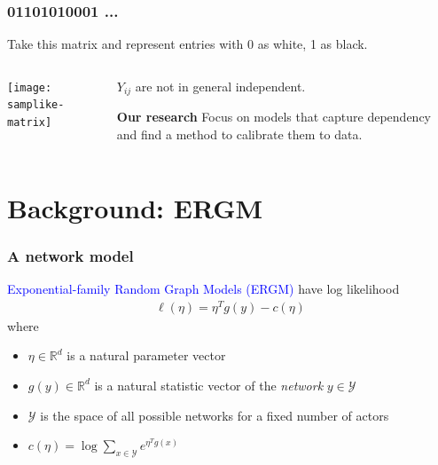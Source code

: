 \documentclass[ 10pt]{beamer}
\def\RR{{\mathbb R}}
\def\YY{{\mathcal Y}}
\newcommand{\fatdot}{\,\cdot\,}
\newcommand{\inner}[1]{\langle #1 \rangle}
\begin{document}
{
\frametitle{01101010001 ...}
Take this matrix and represent entries with 0 as white, 1 as black.
\begin{columns}[T]
\begin{column}[T]{0.4\textwidth}
\texttt{[image: samplike-matrix]}
\end{column}
\pause
\begin{column}[T]{0.6\textwidth}
\vspace{5mm}

$Y_{ij}$ are \alert{not} in general independent.
\vspace{2mm}

\begin{block}{\textbf{Our research}}
Focus on models that capture dependency and find a method to calibrate them to data.
\end{block}

\end{column}
\end{columns}





}
\section{Background: ERGM}
\frame
{
\frametitle{A network model}


\textcolor{blue}{Exponential-family Random Graph Models (ERGM)} have log likelihood
\begin{align*}%
	\ell( \eta) = \eta^T g(y) - c(\eta)
\end{align*}
where 
\begin{itemize}
\item $\eta \in \RR^d$ is a natural parameter vector
\item $g(y)\in\RR^d$ is a natural statistic vector of the \emph{network} $y\in \YY$
\item $\YY$ is the space of all possible networks for a fixed number of actors
\item $	c(\eta) = \log \sum_{x \in \YY} e^{\eta^T g(x) }
$
\end{itemize}




}
\end{document}
